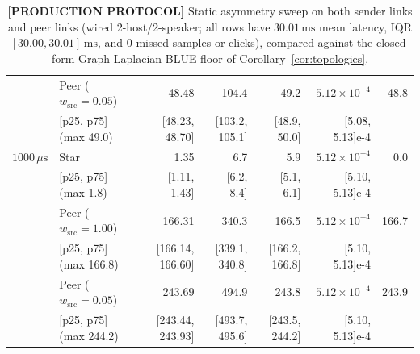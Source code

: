 \documentclass[11pt,a4paper]{article}
\theoremstyle{definition}
\begin{document}
\begin{table}[htb]
\begin{tabular}{@{}l l r r r r r@{}}
 & Peer ($w_{\mathrm{src}}{=}0.05$) & 48.48 & 104.4 & 49.2 & $5.12{\times}10^{-4}$ & 48.8 \\[-1pt]
 & \quad\tiny [p25, p75] (max 49.0) & \tiny [48.23, 48.70] & \tiny [103.2, 105.1] & \tiny [48.9, 50.0] & \tiny [5.08, 5.13]e-4 & \\
\addlinespace[2pt]
$1000\,\mu\text{s}$ & Star & 1.35 & 6.7 & 5.9 & $5.12{\times}10^{-4}$ & 0.0 \\[-1pt]
 & \quad\tiny [p25, p75] (max 1.8) & \tiny [1.11, 1.43] & \tiny [6.2, 8.4] & \tiny [5.1, 6.1] & \tiny [5.10, 5.13]e-4 & \\
 & Peer ($w_{\mathrm{src}}{=}1.00$) & 166.31 & 340.3 & 166.5 & $5.12{\times}10^{-4}$ & 166.7 \\[-1pt]
 & \quad\tiny [p25, p75] (max 166.8) & \tiny [166.14, 166.60] & \tiny [339.1, 340.8] & \tiny [166.2, 166.8] & \tiny [5.10, 5.13]e-4 & \\
 & Peer ($w_{\mathrm{src}}{=}0.05$) & 243.69 & 494.9 & 243.8 & $5.12{\times}10^{-4}$ & 243.9 \\[-1pt]
 & \quad\tiny [p25, p75] (max 244.2) & \tiny [243.44, 243.93] & \tiny [493.7, 495.6] & \tiny [243.5, 244.2] & \tiny [5.10, 5.13]e-4 & \\
\bottomrule
\end{tabular}
\caption{\textbf{[PRODUCTION PROTOCOL]} Static asymmetry sweep on both sender
links and peer links (wired 2-host/2-speaker; all rows have $30.01\,\text{ms}$
mean latency, IQR $[30.00, 30.01]\,\text{ms}$, and $0$ missed samples or
clicks), compared against the closed-form Graph-Laplacian BLUE floor of
Corollary~\ref{cor:topologies}.}
\label{tab:asym}
\end{table}
\end{document}
